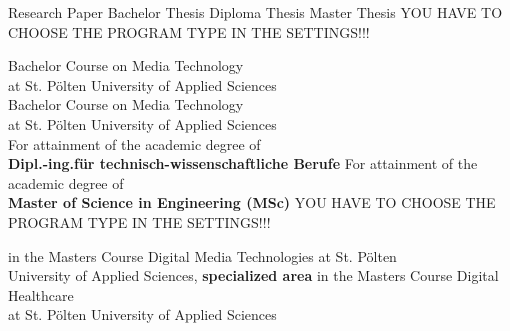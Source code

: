 \begin{center}

\vspace{1cm}

\begin{minipage}[t][5cm][s]{\textwidth}%
\centering
\Huge{{\color{FH2}{\fontsize{24}{30} \selectfont \workTitle\\}}}
\vspace{0.5cm}
\LARGE{{\color{FH2}{\fontsize{16}{24} \selectfont \subTitle\\}}}
\end{minipage}

\vspace{1cm}

\ifuseBachelorDigitalMediaTechnologiesOne
	\LARGE{Research Paper}
\else
	\ifuseBachelorDigitalMediaTechnologiesTwo
		\LARGE{Bachelor Thesis}
\else
	\ifuseMasterDigitalMediaTechnologies
		\LARGE{Diploma Thesis}
\else
	\ifuseMasterDigitalHealthCare
		\LARGE{Master Thesis}
    \else
        \LARGE{YOU HAVE TO CHOOSE THE PROGRAM TYPE IN THE SETTINGS!!!}
  	\fi
\fi
\fi
\fi
  
\vspace{1.3cm}
\ifuseBachelorDigitalMediaTechnologiesOne
	\fontsize{11pt}{15pt}\selectfont Bachelor Course on Media Technology\\
at St. Pölten University of Applied Sciences\\  
\else
	\ifuseBachelorDigitalMediaTechnologiesTwo
		\fontsize{11pt}{15pt}\selectfont Bachelor Course on Media Technology\\
at St. Pölten University of Applied Sciences\\  
\else
	\ifuseMasterDigitalMediaTechnologies
		\fontsize{11pt}{15pt}\selectfont For attainment of the academic degree of\\
		\textbf{Dipl.-ing.für technisch-wissenschaftliche Berufe}
\else
	\ifuseMasterDigitalHealthCare
    	\fontsize{11pt}{15pt}\selectfont For attainment of the academic degree of\\
		\textbf{Master of Science in Engineering (MSc)}
    \else
        \LARGE{YOU HAVE TO CHOOSE THE PROGRAM TYPE IN THE SETTINGS!!!}
  	\fi
\fi
\fi
\fi

\vspace{4mm}
 
\ifuseMasterDigitalMediaTechnologies
	in the Masters Course Digital Media Technologies at St. Pölten\\ 
University of Applied Sciences, \textbf{specialized area \specialization}
\else
	\ifuseMasterDigitalHealthCare
		in the Masters Course Digital Healthcare\\ 
at St. Pölten University of Applied Sciences
    \else
  	\fi
\fi






\end{center}
